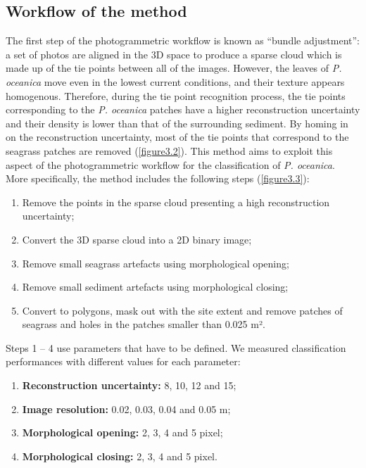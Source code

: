\subsection{Workflow of the method}
The first step of the photogrammetric workflow is known as “bundle adjustment”: a set of photos are aligned in the 3D space to produce a sparse cloud which is made up of the tie points between all of the images. However, the leaves of \textit{P. oceanica} move even in the lowest current conditions, and their texture appears homogenous. Therefore, during the tie point recognition process, the tie points corresponding to the \textit{P. oceanica} patches have a higher reconstruction uncertainty and their density is lower than that of the surrounding sediment. By homing in on the reconstruction uncertainty, most of the tie points that correspond to the seagrass patches are removed (\autoref{figure3.2}). This method aims to exploit this aspect of the photogrammetric workflow for the classification of \textit{P. oceanica}. More specifically, the method includes the following steps (\autoref{figure3.3}):

\begin{enumerate}
\item Remove the points in the sparse cloud presenting a high reconstruction uncertainty;
\item Convert the 3D sparse cloud into a 2D binary image;
\item Remove small seagrass artefacts using morphological opening;
\item Remove small sediment artefacts using morphological closing;
\item Convert to polygons, mask out with the site extent and remove patches of seagrass and holes in the patches smaller than 0.025 m².
\end{enumerate}

Steps 1 – 4 use parameters that have to be defined. We measured classification performances with different values for each parameter:

\begin{enumerate}
\item \textbf{Reconstruction uncertainty:} 8, 10, 12 and 15;
\item \textbf{Image resolution:} 0.02, 0.03, 0.04 and 0.05 m;
\item \textbf{Morphological opening:} 2, 3, 4 and 5 pixel;
\item \textbf{Morphological closing:} 2, 3, 4 and 5 pixel.
\end{enumerate}


